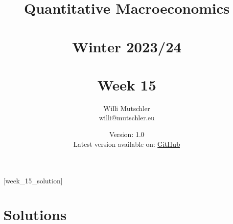 
\newif\ifDisplaySolutions\DisplaySolutionstrue


\title{Quantitative Macroeconomics\\~\\Winter 2023/24\\~\\Week 15}
\author{Willi Mutschler\\willi@mutschler.eu}
\date{Version: 1.0\\Latest version available on: \href{https://github.com/wmutschl/Quantitative-Macroeconomics/releases/latest/download/week_15.pdf}{GitHub}}
\maketitle\thispagestyle{empty}

\newpage
{}[week_15_solution]
\tableofcontents\thispagestyle{empty}\newpage

\setcounter{page}{1}
\newpage
\newpage
\printbibliography

\ifDisplaySolutions
\newpage
\appendix

\section{Solutions}

\fi
